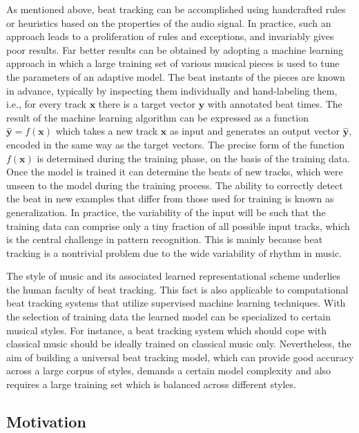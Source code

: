 \documentclass{scrartcl}
\begin{document}
As mentioned above, beat tracking can be accomplished using handcrafted rules or heuristics based on the properties of the audio signal. In practice, such an approach leads to a proliferation of rules and exceptions, and invariably gives poor results. Far better results can be obtained by adopting a machine learning approach in which a large training set of various musical pieces is used to tune the parameters of an adaptive model. The beat instants of the pieces are known in advance, typically by inspecting them individually and hand-labeling them, i.e., for every track $\mathbf x$ there is a target vector $\mathbf y$ with annotated beat times. The result of the machine learning algorithm can be expressed as a function $\hat{\mathbf y} = f (\mathbf x)$ which takes a new track $\mathbf x$ as input and generates an output vector $\hat{\mathbf y}$, encoded in the same way as the target vectors. The precise form of the function $f (\mathbf x)$ is determined during the training phase, on the basis of the training data. Once the model is trained it can  determine the beats of new tracks, which were unseen to the model during the training process. The ability to correctly detect the beat in new examples that differ from those used for training is known as generalization. In practice, the variability of the input will be such that the training data can comprise only a tiny fraction of all possible input tracks, which is the central challenge in pattern recognition. This is mainly because beat tracking is a nontrivial problem due to the wide variability of rhythm in music. 

The style of music and its associated learned representational scheme underlies the human faculty of beat tracking. This fact is also applicable to computational beat tracking systems that utilize supervised machine learning techniques. With the selection of  training data the learned model can be specialized to certain musical styles. For instance, a beat tracking system which should cope with classical music should be ideally trained on classical music only. Nevertheless, the aim of building a universal beat tracking model, which can provide good accuracy across a large corpus of styles, demands a certain model complexity and also requires a large training set which is balanced across different styles. 


\subsection{Motivation}
\end{document}
